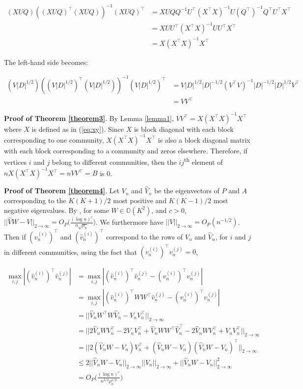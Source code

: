 \documentclass[12pt]{article}
\begin{document}
\[\begin{split}
  (X U Q) ((X U Q)^\top (X U Q))^{-1} (X U Q)^\top &
    = X U Q Q^{-1} U^\top (X^\top X)^{-1}
    U (Q^\top)^{-1} Q^\top U^\top X^\top \\
  & = X U U^\top (X^\top X)^{-1} U U^\top X^\top \\
  & = X (X^\top X)^{-1} X^\top
\end{split}\]

The left-hand side becomes:

\[\begin{split}
  (V |D|^{1/2}) ((V |D|^{1/2})^\top (V |D|^{1/2}))^{-1} (V |D|^{1/2})^\top & =
    V |D|^{1/2} |D|^{-1/2} (V^\top V)^{-1} |D|^{-1/2} |D|^{1/2} V^\top \\
  & = V V^\top
\end{split}\]

\textbf{Proof of Theorem \ref{theorem3}}. By Lemma \ref{lemma1},
\(V V^\top = X (X^\top X)^{-1} X^\top\) where \(X\) is defined as in
(\ref{eq:xy}). Since \(X\) is block diagonal with each block
corresponding to one community, \(X (X^\top X)^{-1} X^\top\) is also a
block diagonal matrix with each block corresponding to a community and
zeros elsewhere. Therefore, if vertices \(i\) and \(j\) belong to
different communities, then the \(ij\)\textsuperscript{th} element of
\(n X (X^\top X)^{-1} X^\top = n V V^\top = B\) is 0.

\textbf{Proof of Theorem \ref{theorem4}}. Let \(V_n\) and \(\hat{V}_n\)
be the eigenvectors of \(P\) and \(A\) corresponding to the
\(K (K + 1) / 2\) most positive and \(K (K - 1) / 2\) most negative
eigenvalues. By \citeauthor{rubindelanchy2017statistical}, for some
\(W \in \mathbb{O}(K^2)\), and \(c > 0\),\\
\(||\hat{V} W - V||_{2 \to \infty} = O_P \big(\frac{(\log n)^c}{n \sqrt{\rho_n}} \big)\).
We furthermore have \(||V||_{2 \to \infty} = O_P(n^{-1/2})\). Then if
\((v_n^{(i)})^\top\) and \((\hat{v}_n^{(i)})^\top\) correspond to the
rows of \(V_n\) and \(\hat{V}_n\), for \(i\) and \(j\) in different
communities, using the fact that \((v_n^{(i)})^\top v_n^{(j)} = 0\),

\[\begin{split}
\max_{i, j} |(\hat{v}_n^{(i)})^\top \hat{v}_n^{(j)}| &
= \max_{i, j} |(\hat{v}_n^{(i)})^\top \hat{v}_n^{(j)} -
(v_n^{(i)})^\top v_n^{(j)}| \\
& = \max_{i, j} |(\hat{v}_n^{(i)})^\top W W^\top \hat{v}_n^{(j)} -
(v_n^{(i)})^\top v_n^{(j)}| \\
& = ||\hat{V}_n W^\top W \hat{V}_n - V_n V_n^\top||_{2 \to \infty} \\
& = ||2 \hat{V}_n W V_n^\top - 2 V_n V_n^\top +
\hat{V}_n W W^\top \hat{V}_n^\top -
2 \hat{V}_n W V_n^\top + V_n V_n^\top||_{2 \to \infty} \\
& = ||2 (\hat{V}_n W - V_n) V_n^\top +
(\hat{V}_n W - V_n) (\hat{V}_n W - V_n)^\top ||_{2 \to \infty} \\
& \leq 2 ||\hat{V}_n W - V_n||_{2 \to \infty} ||V_n||_{2 \to \infty} +
||\hat{V}_n W - V_n||_{2 \to \infty}^2 \\
& = O_P \Big( \frac{(\log n)^c}{n^{3/2} \rho_n^{1/2}} \Big)
\end{split}\]
\end{document}
